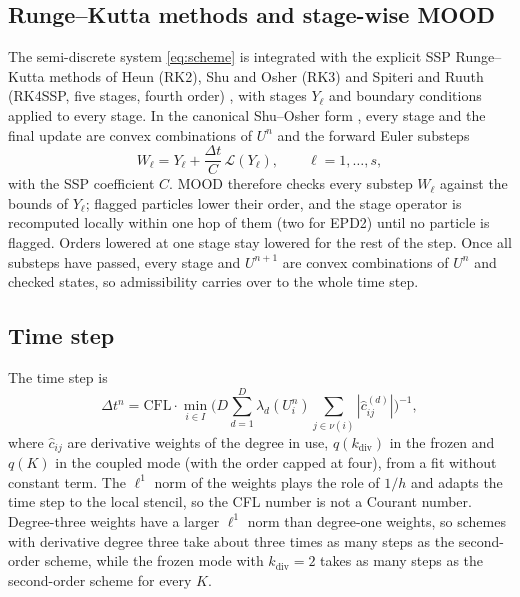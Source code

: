 \documentclass[smallextended]{svjour3}
\numberwithin{equation}{section}
\newcommand{\nb}{\nu}
\newcommand{\Lop}{\mathcal{L}}
\newcommand{\qdiv}{q}
\newcommand{\CFL}{\mathrm{CFL}}
\begin{document}
\subsection{Runge--Kutta methods and stage-wise MOOD}\label{sec:stagemood}

The semi-discrete system \eqref{eq:scheme} is integrated with the explicit SSP Runge--Kutta methods of Heun (RK2), Shu and Osher (RK3) \cite{ShuOsher1988,Gottlieb2001} and Spiteri and Ruuth (RK4SSP, five stages, fourth order) \cite{SpiteriRuuth2002}, with stages $Y_\ell$ and boundary conditions applied to every stage. In the canonical Shu--Osher form \cite{Ketcheson2008,GottliebKetchesonShu2011}, every stage and the final update are convex combinations of $U^n$ and the forward Euler substeps
\begin{equation}\label{eq:substep}
W_\ell = Y_\ell+\frac{\Delta t}{C}\,\Lop(Y_\ell),\qquad \ell=1,\dots,s,
\end{equation}
with the SSP coefficient $C$. MOOD therefore checks every substep $W_\ell$ against the bounds of $Y_\ell$; flagged particles lower their order, and the stage operator is recomputed locally within one hop of them (two for EPD2) until no particle is flagged. Orders lowered at one stage stay lowered for the rest of the step. Once all substeps have passed, every stage and $U^{n+1}$ are convex combinations of $U^n$ and checked states, so admissibility carries over to the whole time step.

\subsection{Time step}\label{sec:timestep}

The time step is
\begin{equation}\label{eq:cfl}
\Delta t^n = \CFL\cdot\min_{i\in I}\Big(D\sum_{d=1}^D\lambda_d(U^n_i)\sum_{j\in\nb(i)}|\hat c^{(d)}_{ij}|\Big)^{-1},
\end{equation}
where $\hat c_{ij}$ are derivative weights of the degree in use, $\qdiv(k_{\mathrm{div}})$ in the frozen and $\qdiv(K)$ in the coupled mode (with the order capped at four), from a fit without constant term. The $\ell^1$ norm of the weights plays the role of $1/h$ and adapts the time step to the local stencil, so the CFL number is not a Courant number. Degree-three weights have a larger $\ell^1$ norm than degree-one weights, so schemes with derivative degree three take about three times as many steps as the second-order scheme, while the frozen mode with $k_{\mathrm{div}}=2$ takes as many steps as the second-order scheme for every $K$.
\end{document}
